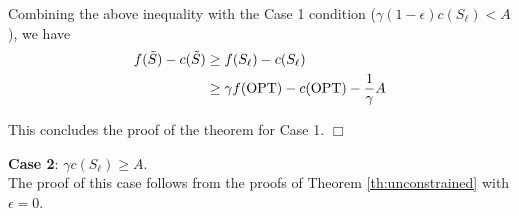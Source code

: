 \documentclass[10pt]{article} %
\DeclareMathOperator*{\argmax}{arg\,max}
\theoremstyle{remark}
\newtheorem{claim}[theorem]{Claim}
\newcommand{\OPT}{{\rm OPT}}
\begin{document}
     
     Combining the above inequality with the Case 1 condition ($\gamma (1-\epsilon)c(S_\ell) < A$), we have 
     \begin{align*}
         f(\Tilde{S})-c(\Tilde{S})& \geq f(S_\ell)-c(S_\ell)\\
         &\geq \gamma f(\OPT)-c(\OPT)-\frac{1}{\gamma}A
     \end{align*}

    {This concludes the proof of the theorem for Case 1}. \hfill $\Box$


 
    \textbf{Case 2}: $\gamma c(S_\ell) \geq A$. \\
    The proof of this case follows from the proofs of Theorem \ref{th:unconstrained} with $\epsilon=0$.
    








\end{document}
